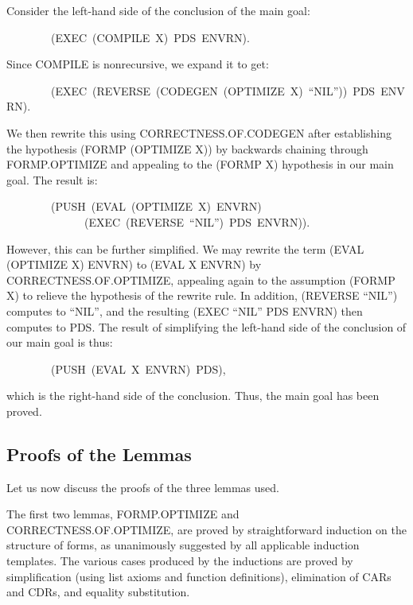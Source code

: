 \documentclass[10pt]{book}
\newenvironment{pubasis}{\begin{flushleft}}{\end{flushleft}}
\begin{document}
Consider the left-hand side of the conclusion of the main goal:
\begin{pubasis}
~~~~~~~~(EXEC~(COMPILE~X)~PDS~ENVRN).\\
\end{pubasis}
Since COMPILE is nonrecursive, we  expand it to get:
\begin{pubasis}
~~~~~~~~(EXEC~(REVERSE~(CODEGEN~(OPTIMIZE~X)~``NIL''))~PDS~ENVRN).\\
\end{pubasis}
We  then rewrite this using CORRECTNESS.OF.CODEGEN after establishing
the hypothesis (FORMP (OPTIMIZE X)) by backwards chaining through
FORMP.OPTIMIZE and appealing to the (FORMP X) hypothesis in our main goal.
The result is:
\begin{pubasis}
~~~~~~~~(PUSH~(EVAL~(OPTIMIZE~X)~ENVRN)\\
~~~~~~~~~~~~~~(EXEC~(REVERSE~``NIL'')~PDS~ENVRN)).\\
\end{pubasis}
However, this can be further simplified.  We may rewrite
the term (EVAL (OPTIMIZE X) ENVRN)
to (EVAL X ENVRN) by CORRECTNESS.OF.OPTIMIZE, appealing
again to the assumption (FORMP X) to relieve the hypothesis
of the rewrite rule.  In addition, (REVERSE ``NIL'') computes to ``NIL'',
and the resulting (EXEC ``NIL'' PDS ENVRN) then computes to PDS.
The result of simplifying the left-hand side of the conclusion of
our main goal is thus:
\begin{pubasis}
~~~~~~~~(PUSH~(EVAL~X~ENVRN)~PDS),\\
\end{pubasis}
which is the right-hand side of the conclusion.  Thus, the
main goal has been proved.
\subsection{Proofs of the Lemmas}
Let us now discuss the proofs of the three lemmas used.

The first two lemmas, FORMP.OPTIMIZE and CORRECTNESS.OF.OPTIMIZE, are proved by straightforward induction on the
structure of forms, as unanimously suggested by all applicable
induction templates.  The various cases produced by the inductions
are proved by simplification (using list axioms and function definitions),
elimination of CARs and CDRs, and equality substitution.
\end{document}
